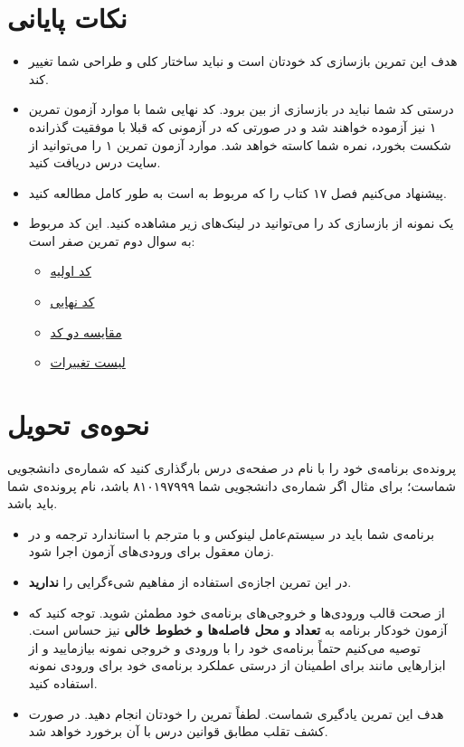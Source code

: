 \documentclass{utap}
\begin{document}
\section{نکات پایانی}
	  \begin{itemize}
	        \item
هدف این تمرین بازسازی کد خودتان است و نباید ساختار کلی و طراحی شما تغییر کند.
		\item
درستی کد شما نباید در بازسازی از بین برود.
کد نهایی شما با موارد آزمون تمرین ۱ نیز آزموده خواهند شد و در صورتی که در آزمونی که قبلا با موفقیت گذرانده شکست بخورد، نمره شما کاسته خواهد شد.
موارد آزمون تمرین ۱ را می‌توانید از سایت درس دریافت کنید.
		\item
پیشنهاد می‌کنیم فصل ۱۷ کتاب  را که مربوط به  است به طور کامل مطالعه کنید.
		\item
یک نمونه از بازسازی کد را می‌توانید در لینک‌های زیر مشاهده کنید. این کد مربوط به سوال دوم تمرین صفر است:
\begin{itemize}[noitemsep]
    \item \href{https://github.com/amirhbv/AP-Spring98-Refactoring/blob/9a343d51e5ad14e59384a166928c5f808fe9ba35/main.cpp}{کد اولیه}
    \item \href{https://github.com/amirhbv/AP-Spring98-Refactoring/blob/master/main.cpp}{کد نهایی}
    \item \href{https://github.com/amirhbv/AP-Spring98-Refactoring/compare/9a343d51e5ad14e59384a166928c5f808fe9ba35..master?diff=split#diff-118fcbaaba162ba17933c7893247df3a}{مقایسه دو کد}
    \item \href{https://github.com/amirhbv/AP-Spring98-Refactoring/commits/master}{لیست تغییرات}
\end{itemize}

\end{itemize}

\section{نحوه‌ی تحویل}
    پرونده‌ی برنامه‌ی خود را با نام  در صفحه‌ی  درس بارگذاری کنید که  شماره‌ی دانشجویی شماست؛ برای مثال اگر شماره‌ی دانشجویی شما ۸۱۰۱۹۷۹۹۹ باشد، نام پرونده‌ی شما باید  باشد.
    \begin{itemize}
        \item
برنامه‌ی شما باید در سیستم‌عامل لینوکس و با مترجم  با استاندارد  ترجمه و در زمان معقول برای ورودی‌های آزمون اجرا شود.
        \item
در این تمرین اجازه‌ی استفاده از مفاهیم شیءگرایی را \textbf{ندارید}.
        \item
از صحت قالب ورودی‌ها و خروجی‌های برنامه‌ی خود مطمئن شوید. توجه کنید که آزمون خودکار برنامه به \textbf{تعداد و محل فاصله‌ها و خطوط خالی} نیز حساس است. توصیه می‌کنیم حتماً برنامه‌ی خود را با ورودی و خروجی نمونه بیازمایید و از ابزارهایی مانند  برای اطمینان از درستی عملکرد برنامه‌ی خود برای ورودی نمونه استفاده کنید.
        \item
هدف این تمرین یادگیری شماست. لطفاً تمرین را خودتان انجام دهید. در صورت کشف تقلب مطابق قوانین درس با آن برخورد خواهد شد.
    \end{itemize}
\end{document}
